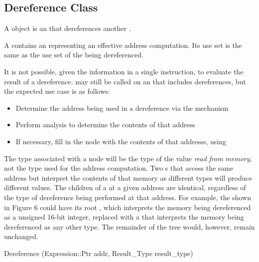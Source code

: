 \subsection{Dereference Class}
\label{sec:dereference}

A  object is an  that dereferences another
.

A  contains an  representing an effective address
computation. Its use set is the same as the use set of the  being
dereferenced.

It is not possible, given the information in a single instruction, to evaluate the
result of a dereference.  may still be called on an 
that includes dereferences, but the expected use case is as follows:

\begin{itemize}
\item Determine the address being used in a dereference via the  mechanism
\item Perform analysis to determine the contents of that address
\item If necessary, fill in the  node with the contents of that addresss, using  
\end{itemize}

The type associated with a  node will be the type of the value
{\itshape read\/} {\itshape from\/} {\itshape memory\/}, not the type used for
the address computation. Two s that access the same address but
interpret the contents of that memory as different types will produce different values.
The children of a  at a given address are identical,
regardless of the type of dereference being performed at that address. For example,
the  shown in Figure 6 could have its root , which
interprets the memory being dereferenced as a unsigned 16-\/bit integer, replaced
with a  that interprets the memory being dereferenced as any
other type. The remainder of the  tree would, however, remain
unchanged.

\begin{apient}
Dereference (Expression::Ptr addr, Result_Type result_type)
\end{apient}


